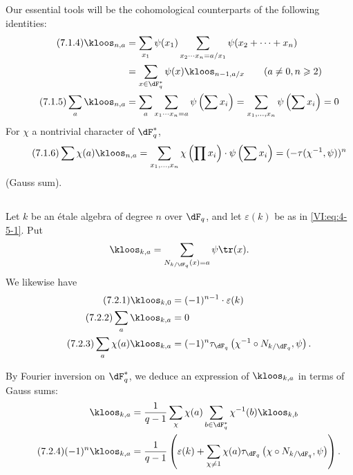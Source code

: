 Our essential tools will be the cohomological counterparts of the 
following identities: 
\begin{align*}\tag{7.1.4}\label{VI:eq:7-1-4}
  \kloos_{n,a} &= \sum_{x_1} \psi(x_1) \sum_{x_2\dotsm x_n = a/x_1} \psi(x_2+\cdots + x_n) \\ \notag
    &= \sum_{x\in \dF_q^\ast} \psi(x) \kloos_{n-1,a/x} \qquad (a\ne 0,n\geqslant 2) \\ \tag{7.1.5}\label{VI:eq:7-1-5}
  \sum_a \kloos_{n,a} &= \sum_a \sum_{x_1 \dotsm x_n = a} \psi\left(\sum x_i\right) = \sum_{x_1,\dots,x_n} \psi\left(\sum x_i\right) = 0 
\end{align*}
For $\chi$ a nontrivial character of $\dF_q^\ast$, 
\begin{equation*}\tag{7.1.6}\label{VI:eq:7-1-6}
  \sum \chi(a) \kloos_{n,a} = \sum_{x_1,\dots,x_n} \chi\left(\prod x_i\right) \cdot \psi\left(\sum x_i\right) = (-\tau(\chi^{-1},\psi))^n 
\end{equation*}
(Gauss sum). 





\subsection{}\label{VI:7-2}

Let $k$ be an étale algebra of degree $n$ over $\dF_q$, and let $\varepsilon(k)$ 
be as in \eqref{VI:eq:4-5-1}. Put 
\[
  \kloos_{k,a} = \sum_{N_{k/\dF_q}(x)=a} \psi \tr(x) \text{.} 
\]
We likewise have 
\begin{align*}\tag{7.2.1}\label{VI:eq:7-2-1}
  \kloos_{k,0} &= (-1)^{n-1} \cdot \varepsilon(k) \\ \tag{7.2.2}\label{VI:eq:7-2-2}
  \sum_a \kloos_{k,a} &= 0 \\ \tag{7.2.3}\label{VI:eq:7-2-3}
  \sum_a \chi(a) \kloos_{k,a} &= (-1)^n \tau_{\dF_q}\left(\chi^{-1}\circ N_{k/\dF_q},\psi\right) \text{.} 
\end{align*}

By Fourier inversion on $\dF_q^\ast$, we deduce an expression of 
$\kloos_{k,a}$ in terms of Gauss sums: 
\begin{align*} 
  \kloos_{k,a} &= \frac{1}{q-1} \sum_\chi \chi(a) \sum_{b\in \dF_q^\ast} \chi^{-1}(b) \kloos_{k,b} \\ \tag{7.2.4}\label{VI:eq:7-2-4}
  (-1)^n \kloos_{k,a} &= \frac{1}{q-1} \left(\varepsilon(k) + \sum_{\chi\ne 1} \chi(a) \tau_{\dF_q}\left(\chi\circ N_{k/\dF_q},\psi\right) \right) \text{.} 
\end{align*}

